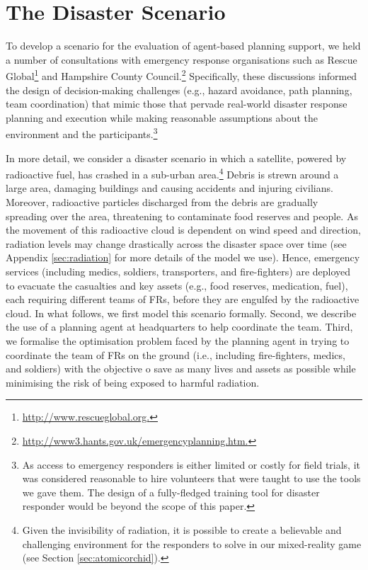 \section{The Disaster Scenario}\label{sec:scenario}
\noindent To develop a scenario for the evaluation of agent-based planning support, we held a number of consultations with emergency response organisations such as Rescue Global\footnote{\url{http://www.rescueglobal.org.}} and Hampshire County Council.\footnote{\url{http://www3.hants.gov.uk/emergencyplanning.htm.}} Specifically,  these discussions informed the design of decision-making challenges  (e.g., hazard avoidance, path planning, team coordination) that mimic those that pervade real-world disaster response planning and execution while making reasonable assumptions about the environment and the participants.\footnote{As access to emergency responders is either limited or costly for field trials, it was considered reasonable to hire volunteers that were taught to use the tools we gave them. The design of a fully-fledged training tool for disaster responder would be beyond the scope of this paper.}  

In more detail, we consider a disaster scenario in which a satellite, powered by radioactive fuel,  has crashed in a sub-urban area.\footnote{Given the invisibility of radiation, it is possible to create a believable and challenging environment for the responders to solve in our mixed-reality game (see Section \ref{sec:atomicorchid}).} Debris is strewn around a large area, damaging buildings and causing accidents and injuring civilians. Moreover, radioactive particles discharged from the debris are gradually spreading over the area, threatening to contaminate food reserves and people. As the movement of this radioactive cloud is dependent on wind speed and direction, radiation levels may change drastically across the disaster space over time (see Appendix \ref{sec:radiation} for more details of the model we use). Hence, emergency services (including medics, soldiers, transporters, and fire-fighters) are deployed to  evacuate the casualties and key assets (e.g., food reserves, medication, fuel), each requiring different teams of FRs, before they are engulfed by the radioactive cloud.  In what follows, we first model this scenario formally. Second, we describe the use of a planning agent at headquarters to help coordinate the team. Third, we formalise  the optimisation problem faced by the planning agent in trying to coordinate the team of FRs on the ground (i.e., including fire-fighters, medics, and soldiers) with the objective o save as many lives and assets as possible while minimising the risk of being exposed to harmful radiation.  

